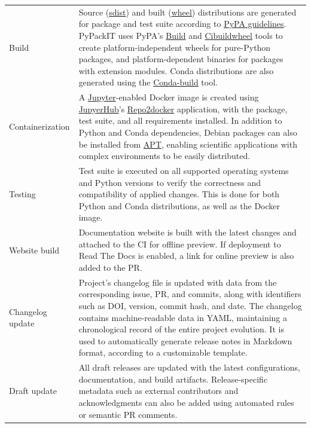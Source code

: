 \documentclass{article}
\begin{document}
\begin{table}[h!]
\begin{tabularx}{\textwidth}{p{} X}
Build & Source (\href{https://packaging.python.org/en/latest/glossary/\#term-Source-Distribution-or-sdist}{sdist}) and built (\href{https://packaging.python.org/en/latest/glossary/\#term-Built-Distribution}{wheel}) distributions are generated for package and test suite according to \href{https://packaging.python.org/en/latest/tutorials/packaging-projects/\#generating-distribution-archives}{PyPA guidelines}. PyPackIT uses PyPA's \href{https://build.pypa.io/}{Build} and \href{https://cibuildwheel.pypa.io/}{Cibuildwheel} tools to create platform-independent wheels for pure-Python packages, and platform-dependent binaries for packages with extension modules. Conda distributions are also generated using the \href{https://docs.conda.io/projects/conda-build/en/stable/}{Conda-build} tool.\\

Containerization & A \href{https://jupyter.org/}{Jupyter}-enabled Docker image is created using \href{https://jupyter.org/hub}{JupyerHub}'s \href{https://github.com/jupyterhub/repo2docker}{Repo2docker} application, with the package, test suite, and all requirements installed. In addition to Python and Conda dependencies, Debian packages can also be installed from \href{https://wiki.debian.org/apt-get}{APT}, enabling scientific applications with complex environments to be easily distributed.\\

Testing & Test suite is executed on all supported operating systems and Python versions to verify the correctness and compatibility of applied changes. This is done for both Python and Conda distributions, as well as the Docker image. \\

Website build & Documentation website is built with the latest changes and attached to the CI for offline preview. If deployment to Read The Docs is enabled, a link for online preview is also added to the PR.\\

Changelog update & Project's changelog file is updated with data from the corresponding issue, PR, and commits, along with identifiers such as DOI, version, commit hash, and date. The changelog contains machine-readable data in YAML, maintaining a chronological record of the entire project evolution. It is used to automatically generate release notes in Markdown format, according to a customizable template.  \\

Draft update & All draft releases are updated with the latest configurations, documentation, and build artifacts. Release-specific metadata such as external contributors and acknowledgments can also be added using automated rules or semantic PR comments. \\


\end{tabularx}
\end{table}
\end{document}
